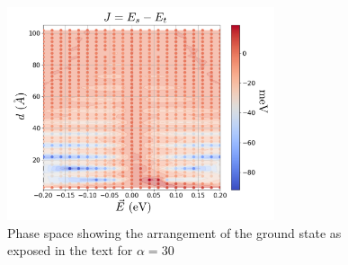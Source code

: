 \begin{figure}[h!]
\centering
  \includegraphics[width=0.7\textwidth]{artlat/fig/phase_J30.pdf}
\vspace{-5pt}
\caption{Phase space showing the arrangement of the ground state as exposed in the text for $\alpha=30$}
\label{}
\end{figure}
\FloatBarrier

